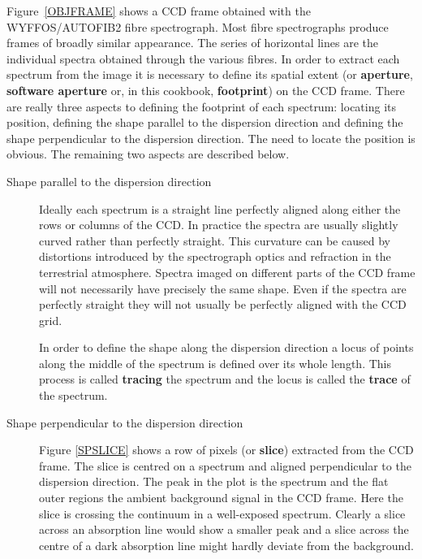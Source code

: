 \documentclass[twoside,11pt]{starlink}
\begin{document}
Figure~\ref{OBJFRAME} shows a CCD frame obtained with the WYFFOS/AUTOFIB2
fibre spectrograph.  Most fibre spectrographs produce frames of broadly
similar appearance.  The series of horizontal lines are the individual
spectra obtained through the various fibres.  In order to extract each
spectrum from the image it is necessary to define its spatial extent (or
\textbf{aperture}, \textbf{software aperture} or, in this cookbook, \textbf{footprint}) on the CCD frame.  There are really three aspects to defining
the footprint of each spectrum: locating its position, defining the shape
parallel to the dispersion direction and defining the shape perpendicular
to the dispersion direction.  The need to locate the position is obvious.
The remaining two aspects are described below.

\begin{description}

  \item[Shape parallel to the dispersion direction] Ideally each
   spectrum is a straight line perfectly aligned along either the
   rows or columns of the CCD.  In practice the spectra are usually
   slightly curved rather than perfectly straight.  This curvature can
   be caused by distortions introduced by the spectrograph optics and
   refraction in the terrestrial atmosphere.  Spectra imaged on
   different parts of the CCD frame will not necessarily have precisely
   the same shape.  Even if the spectra are perfectly straight they
   will not usually be perfectly aligned with the CCD grid.

   In order to define the shape along the dispersion direction a locus
   of points along the middle of the spectrum is defined over its whole
   length.  This process is called \textbf{tracing} the spectrum and the
   locus is called the \textbf{trace} of the spectrum.

  \item[Shape perpendicular to the dispersion direction] Figure
   \ref{SPSLICE} shows a row of pixels (or \textbf{slice}) extracted from
   the CCD frame.  The slice is centred on a spectrum and aligned
   perpendicular to the dispersion direction.  The peak in the plot is
   the spectrum and the flat outer regions the ambient background signal
   in the CCD frame.  Here the slice is crossing the continuum in a
   well-exposed spectrum.  Clearly a slice across an absorption line
   would show a smaller peak and a slice across the centre of a dark
   absorption line might hardly deviate from the background.


\end{description}
\end{document}
